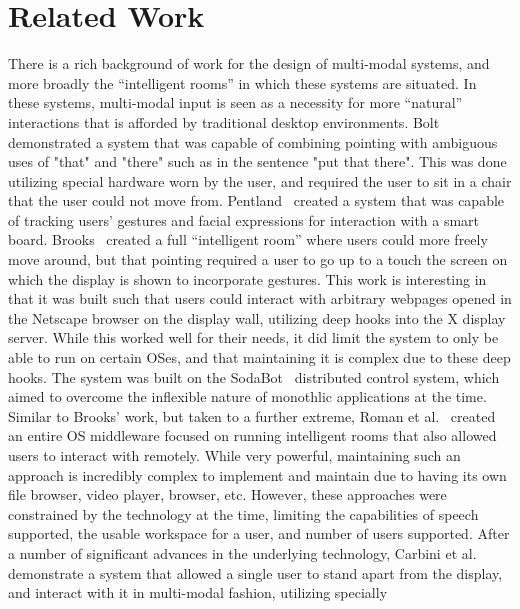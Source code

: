 \section{Related Work}\label{sec:cais_prior_work}

There is a rich background of work for the design of multi-modal systems, and 
more broadly the ``intelligent rooms'' in which these systems are situated. In
these systems, multi-modal input is seen as a necessity for more ``natural''
interactions that is afforded by traditional desktop environments.
Bolt~\cite{bolt_put-that-there:_1980} demonstrated a system that was capable
of combining pointing with ambiguous uses of "that" and "there" such as in
the sentence "put that there". This was done utilizing special hardware worn
by the user, and required the user to sit in a chair that the user could not
move from. Pentland~\cite{pentland_smart_1996} created a system that was
capable of tracking users' gestures and facial expressions for interaction
with a smart board. Brooks~\cite{brooks_intelligent_1997} created a full 
``intelligent room'' where users could more freely move around, but
that pointing required a user to go up to a touch the screen on which the
display is shown to incorporate gestures. This work is interesting in that
it was built such that users could interact with arbitrary webpages opened
in the Netscape browser on the display wall, utilizing deep hooks into the X
display server. While this worked well for their needs, it did limit the system
to only be able to run on certain OSes, and that maintaining it is complex due
to these deep hooks. The system was built on the
SodaBot~\cite{coen_sodabot:_1994} distributed control system, which aimed to 
overcome the inflexible nature of monothlic applications at the time. Similar
to Brooks' work, but taken to a further extreme, Roman et 
al.~\cite{roman_middleware_2002} created an entire OS middleware focused on running
intelligent rooms that also allowed users to interact with remotely. While very
powerful, maintaining such an approach is incredibly complex to implement and
maintain due to having its own file browser, video player, browser, etc.
However, these approaches were constrained by the technology at the time,
limiting the capabilities of speech supported, the usable workspace for a
user, and number of users supported. After a number of significant advances in 
the underlying technology, Carbini et al.~\cite{carbini_wizard_2006} 
demonstrate a system that allowed a single user to stand apart from the
display, and interact with it in multi-modal fashion, utilizing specially
